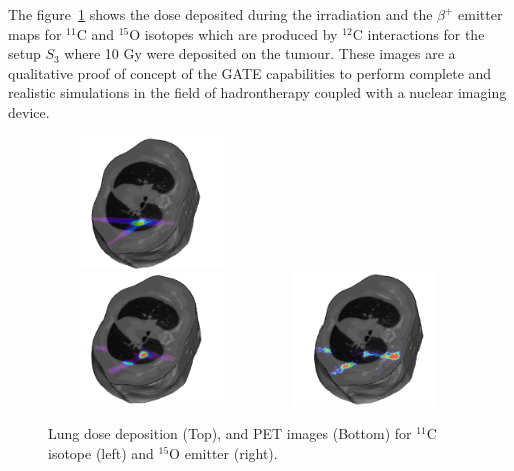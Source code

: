 \documentclass[11pt]{iopart}
\begin{document}


The figure~\ref{fig:fig1} shows the dose deposited during the
irradiation and the $\beta^+$ emitter maps for $^{11}$C and $^{15}$O
isotopes which are produced by $^{12}$C interactions for the setup $S_{3}$
where 10 Gy were deposited on the tumour. These images are a
qualitative proof of concept of the GATE capabilities to perform
complete and realistic simulations in the field of hadrontherapy
coupled with a nuclear imaging device.

\begin{figure}[!h]
  \centering
  \includegraphics[width=55mm,height=35mm]{figures/3D-Dose_poumon.jpg}\\
  \includegraphics[width=55mm,height=35mm]{figures/3D-PETC11_poumon.jpg}
  \includegraphics[width=55mm,height=35mm]{figures/3D-PETO15_poumon.jpg}
  \caption{Lung dose deposition (Top), and PET images (Bottom) for $^{11}$C isotope (left) and $^{15}$O emitter (right).}
  
\label{fig:fig1}
\end{figure}
\end{document}
